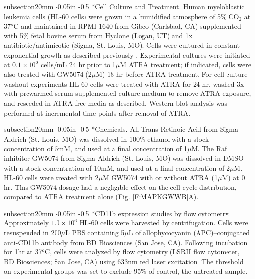 \documentclass[12pt]{article}
\makeatletter
\renewcommand\subsection{\@startsection
	{subsection}{2}{0mm}
	{-0.05in}
	{-0.5\baselineskip}
	{\normalfont\normalsize\bfseries}}
\makeatother
\begin{document}
\subsection*{Cell Culture and Treatment.}
Human myeloblastic leukemia cells (HL-60 cells) were grown in a humidified atmosphere of 5\% CO$_2$ at 37$^{o}$C and maintained in RPMI 1640 from Gibco (Carlsbad, CA) 
supplemented with 5\% fetal bovine serum from Hyclone (Logan, UT) and 1x antibiotic/antimicotic (Sigma, St. Louis, MO).
Cells were cultured in constant exponential growth as described previously \cite{Brooks1996}. 
Experimental cultures were initiated at $0.1\times10^6$ cells/mL 24 hr prior to 1$\mu$M ATRA treatment;
if indicated, cells were also treated with GW5074 (2$\mu$M) 18 hr before ATRA treatment.   
For cell culture washout experiments HL-60 cells were treated with ATRA for 24 hr, 
washed 3x with prewarmed serum supplemented culture medium to remove ATRA exposure, 
and reseeded in ATRA-free media as described. 
Western blot analysis was performed at incremental time points after removal of ATRA.

\subsection*{Chemicals.}
All-Trans Retinoic Acid from Sigma-Aldrich (St. Louis, MO) was dissolved in 100\% ethanol with a stock concentration of 5mM, 
and used at a final concentration of 1$\mu$M.
The Raf inhibitor GW5074 from Sigma-Aldrich (St. Louis, MO) was dissolved in DMSO with a stock concentration of 10mM, 
and used at a final concentration of 2$\mu$M.
HL-60 cells were treated with 2$\mu$M GW5074 with or without ATRA (1$\mu$M) at 0 hr.  
This GW5074 dosage had a negligible effect on the cell cycle distribution, compared to ATRA treatment alone (Fig. \ref{F:MAPKGWWB}A). 

\subsection*{CD11b expression studies by flow cytometry.}
Approximately $1.0\times10^6$ HL-60 cells were harvested  by centrifugation. 
Cells were resuspended in 200$\mu$L PBS containing 5$\mu$L of allophycocyanin (APC)–conjugated anti-CD11b antibody from BD Biosciences (San Jose, CA). 
Following incubation for 1hr at 37$^{o}$C, cells were analyzed by flow cytometry (LSRII flow cytometer, BD Biosciences; San Jose, CA) using 633nm red laser excitation. 
The threshold on experimental groups was set to exclude 95\% of control, the untreated sample. 
\end{document}
